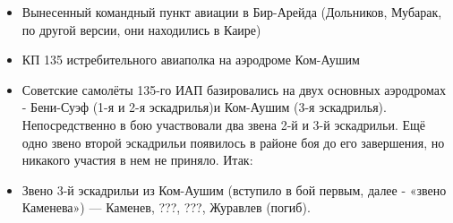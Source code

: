 \begin{itemize}
	\item Вынесенный командный пункт авиации в Бир-Арейда (Дольников, Мубарак, по другой версии, они находились в Каире)
	\item КП 135 истребительного авиаполка на аэродроме Ком-Аушим
	\item Советские самолёты 135-го ИАП базировались на двух основных аэродромах - Бени-Суэф (1-я и 2-я эскадрилья)и Ком-Аушим (3-я эскадрилья). Непосредственно в бою участвовали два звена 2-й и 3-й эскадрильи. Ещё одно звено второй эскадрильи появилось в районе боя до его завершения, но никакого участия в нем не приняло. Итак:
	\item Звено 3-й эскадрильи из Ком-Аушим (вступило в бой первым, далее - «звено Каменева») — Каменев, ???, ???, Журавлев (погиб). 
	

\end{itemize}
